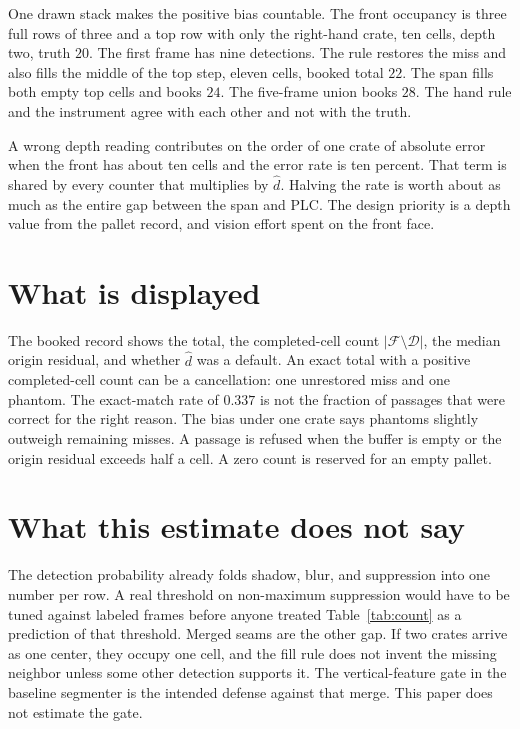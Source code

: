 \documentclass[10pt]{article}
\begin{document}
One drawn stack makes the positive bias countable. The front occupancy is three full rows of three and a top row with only the right-hand crate, ten cells, depth two, truth $20$. The first frame has nine detections. The rule restores the miss and also fills the middle of the top step, eleven cells, booked total $22$. The span fills both empty top cells and books $24$. The five-frame union books $28$. The hand rule and the instrument agree with each other and not with the truth.

A wrong depth reading contributes on the order of one crate of absolute error when the front has about ten cells and the error rate is ten percent. That term is shared by every counter that multiplies by $\hat d$. Halving the rate is worth about as much as the entire gap between the span and PLC. The design priority is a depth value from the pallet record, and vision effort spent on the front face.

\section{What is displayed}
The booked record shows the total, the completed-cell count $|\mathcal{F}\setminus\mathcal{D}|$, the median origin residual, and whether $\hat d$ was a default. An exact total with a positive completed-cell count can be a cancellation: one unrestored miss and one phantom. The exact-match rate of $0.337$ is not the fraction of passages that were correct for the right reason. The bias under one crate says phantoms slightly outweigh remaining misses. A passage is refused when the buffer is empty or the origin residual exceeds half a cell. A zero count is reserved for an empty pallet.

\section{What this estimate does not say}
The detection probability already folds shadow, blur, and suppression into one number per row. A real threshold on non-maximum suppression would have to be tuned against labeled frames before anyone treated Table~\ref{tab:count} as a prediction of that threshold. Merged seams are the other gap. If two crates arrive as one center, they occupy one cell, and the fill rule does not invent the missing neighbor unless some other detection supports it. The vertical-feature gate in the baseline segmenter is the intended defense against that merge. This paper does not estimate the gate.
\end{document}
